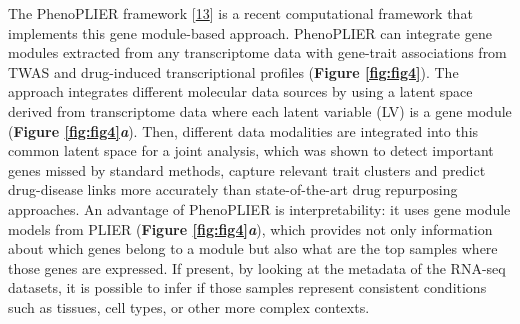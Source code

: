 The PhenoPLIER framework {[}\protect\hyperlink{ref-NM3rHx1i}{13}{]} is a recent computational framework that implements this gene module-based approach.
PhenoPLIER can integrate gene modules extracted from any transcriptome data with gene-trait associations from TWAS and drug-induced transcriptional profiles (\textbf{Figure \ref{fig:fig4}}).
The approach integrates different molecular data sources by using a latent space derived from transcriptome data where each latent variable (LV) is a gene module (\textbf{Figure \ref{fig:fig4}\emph{a}}).
Then, different data modalities are integrated into this common latent space for a joint analysis, which was shown to detect important genes missed by standard methods, capture relevant trait clusters and predict drug-disease links more accurately than state-of-the-art drug repurposing approaches.
An advantage of PhenoPLIER is interpretability: it uses gene module models from PLIER (\textbf{Figure \ref{fig:fig4}\emph{a}}), which provides not only information about which genes belong to a module but also what are the top samples where those genes are expressed.
If present, by looking at the metadata of the RNA-seq datasets, it is possible to infer if those samples represent consistent conditions such as tissues, cell types, or other more complex contexts.

